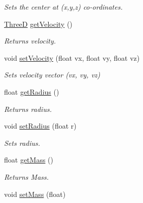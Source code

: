 \begin{DoxyCompactItemize}
\begin{DoxyCompactList}\small\item\em Sets the center at (x,y,z) co-\/ordinates. \end{DoxyCompactList}\item 
\hypertarget{class_ball_af131ca37d9663b815519c71febbd23e8}{\hyperlink{global_8h_a62cc051caefbc94bc22d587ea537d9e8}{Three\-D} \hyperlink{class_ball_af131ca37d9663b815519c71febbd23e8}{get\-Velocity} ()}\label{class_ball_af131ca37d9663b815519c71febbd23e8}

\begin{DoxyCompactList}\small\item\em Returns velocity. \end{DoxyCompactList}\item 
\hypertarget{class_ball_a75f6bb4498d347018aa445933f2603b0}{void \hyperlink{class_ball_a75f6bb4498d347018aa445933f2603b0}{set\-Velocity} (float vx, float vy, float vz)}\label{class_ball_a75f6bb4498d347018aa445933f2603b0}

\begin{DoxyCompactList}\small\item\em Sets velocity vector (vx, vy, vz) \end{DoxyCompactList}\item 
\hypertarget{class_ball_a01a1890f5a86e8caeb4f91660a4f5700}{float \hyperlink{class_ball_a01a1890f5a86e8caeb4f91660a4f5700}{get\-Radius} ()}\label{class_ball_a01a1890f5a86e8caeb4f91660a4f5700}

\begin{DoxyCompactList}\small\item\em Returns radius. \end{DoxyCompactList}\item 
\hypertarget{class_ball_a5b2818b0d9db0c5bc8cd54f7753ff752}{void \hyperlink{class_ball_a5b2818b0d9db0c5bc8cd54f7753ff752}{set\-Radius} (float r)}\label{class_ball_a5b2818b0d9db0c5bc8cd54f7753ff752}

\begin{DoxyCompactList}\small\item\em Sets radius. \end{DoxyCompactList}\item 
\hypertarget{class_ball_a29f534fe6b99e133059ca0ca30000c8e}{float \hyperlink{class_ball_a29f534fe6b99e133059ca0ca30000c8e}{get\-Mass} ()}\label{class_ball_a29f534fe6b99e133059ca0ca30000c8e}

\begin{DoxyCompactList}\small\item\em Returns Mass. \end{DoxyCompactList}\item 
\hypertarget{class_ball_ab82f37cdc463d7400943a5245cc6d6f7}{void \hyperlink{class_ball_ab82f37cdc463d7400943a5245cc6d6f7}{set\-Mass} (float)}\label{class_ball_ab82f37cdc463d7400943a5245cc6d6f7}


\end{DoxyCompactItemize}
